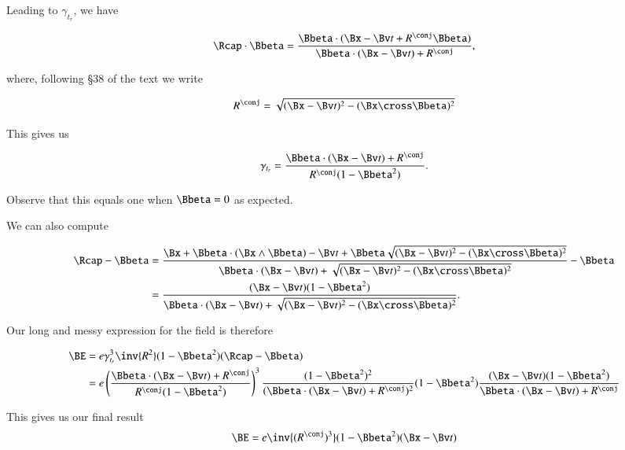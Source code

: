 Leading to $\gamma_{t_r}$, we have

\begin{equation}\label{eqn:relElectroDynProblemSet5:940}
\Rcap \cdot \Bbeta = \frac{\Bbeta \cdot (\Bx - \Bv t + R^\conj \Bbeta)}{\Bbeta \cdot (\Bx - \Bv t) + R^\conj},
\end{equation}

where, following \S 38 of the text we write

\begin{equation}\label{eqn:relElectroDynProblemSet5:960}
R^\conj = \sqrt{(\Bx - \Bv t)^2 - (\Bx \cross \Bbeta)^2 }
\end{equation}

This gives us

\begin{equation}\label{eqn:relElectroDynProblemSet5:790}
\gamma_{t_r} = 
\frac{\Bbeta \cdot (\Bx - \Bv t) + R^\conj}{R^\conj(1 - \Bbeta^2)}.
\end{equation}

Observe that this equals one when $\Bbeta = 0$ as expected.

We can also compute

\begin{align*}
\Rcap - \Bbeta &= 
\frac{\Bx + \Bbeta \cdot (\Bx \wedge \Bbeta) - \Bv t + \Bbeta \sqrt{ (\Bx - \Bv t)^2 - (\Bx \cross \Bbeta)^2 }}{ 
\Bbeta \cdot (\Bx - \Bv t) + \sqrt{ (\Bx - \Bv t)^2 - (\Bx \cross \Bbeta)^2 } 
} - \Bbeta \\
&=
\frac{(\Bx - \Bv t)(1 -\Bbeta^2)}{
\Bbeta \cdot (\Bx - \Bv t) + \sqrt{ (\Bx - \Bv t)^2 - (\Bx \cross \Bbeta)^2 } 
}.
\end{align*}

Our long and messy expression for the field is therefore

\begin{align*}
\BE &=
e \gamma_{t_r}^3 \inv{R^2} (1 - \Bbeta^2)(\Rcap - \Bbeta) \\
&=
e 
\left( 
\frac{\Bbeta \cdot (\Bx - \Bv t) + R^\conj}{R^\conj(1 - \Bbeta^2)}
\right)^3
\frac{(1 - \Bbeta^2)^2 }{ (\Bbeta \cdot (\Bx - \Bv t) + R^\conj)^2 } 
(1 -\Bbeta^2)
\frac{(\Bx - \Bv t)(1 -\Bbeta^2)}{
\Bbeta \cdot (\Bx - \Bv t) + R^\conj
} \\
\end{align*}

This gives us our final result
\begin{equation}\label{eqn:relElectroDynProblemSet5:980}
\BE =
e \inv{(R^\conj)^3}
(1 -\Bbeta^2)
(\Bx - \Bv t)
\end{equation}

